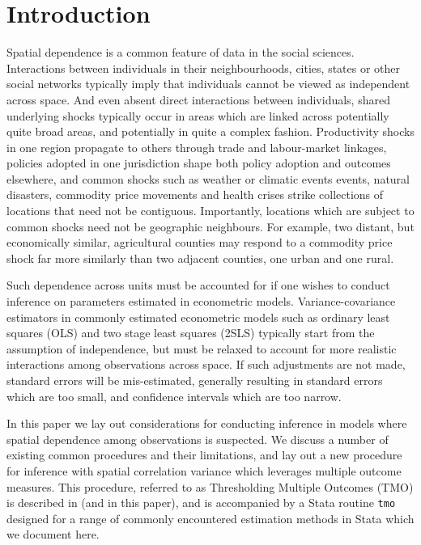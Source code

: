 \documentclass[varwidth,bib]{statapress}
\begin{document}
\clearpage
\section{Introduction}
Spatial dependence is a common feature of data in the social sciences.  Interactions between individuals in their neighbourhoods, cities, states or other social networks typically imply that individuals cannot be viewed as independent across space. And even absent direct interactions between individuals, shared underlying shocks typically occur in areas which are linked across potentially quite broad areas, and potentially in quite a complex fashion.  Productivity shocks in one region propagate to others through trade and labour-market linkages, policies adopted in one jurisdiction shape both policy adoption and outcomes elsewhere, and common shocks such as weather or climatic events events, natural disasters, commodity price movements and health crises strike collections of locations that need not be contiguous.  Importantly, locations which are subject to common shocks need not be geographic neighbours.  For example, two distant, but economically similar, agricultural counties may respond to a commodity price shock far more similarly than two adjacent counties, one urban and one rural.

Such dependence across units must be accounted for if one wishes to conduct inference on parameters estimated in econometric models.  Variance-covariance estimators in commonly estimated econometric models such as ordinary least squares (OLS) and two stage least squares (2SLS) typically start from the assumption of independence, but must be relaxed to account for more realistic interactions among observations across space. If such adjustments are not made, standard errors will be mis-estimated, generally resulting in standard errors which are too small, and confidence intervals which are too narrow.

In this paper we lay out considerations for conducting inference in models where spatial dependence among observations is suspected.  We discuss a number of existing common procedures and their limitations, and lay out a new procedure for inference with spatial correlation variance which leverages multiple outcome measures.  This procedure, referred to as Thresholding Multiple Outcomes (TMO) is described in \citet{Dellavignaetal2025} (and in this paper), and is accompanied by a Stata routine {\tt tmo} designed for a range of commonly encountered estimation methods in Stata which we document here.
\end{document}
